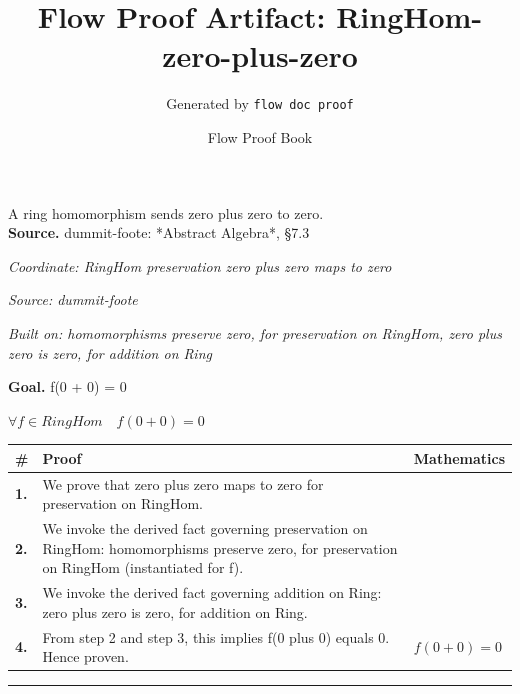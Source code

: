 \documentclass[11pt]{article}
\title{Flow Proof Artifact: RingHom-zero-plus-zero}
\author{Generated by \texttt{flow doc proof}}
\date{Flow Proof Book}
\theoremstyle{definition}
\begin{document}
\maketitle
A ring homomorphism sends zero plus zero to zero.\\[0.5em]
\textbf{Source.} dummit-foote: *Abstract Algebra*, §7.3\\[0.5em]
\bigskip
{}\par
\smallskip\noindent\textit{Coordinate: RingHom \cdot preservation \cdot zero plus zero maps to zero}\par
\smallskip\noindent\textit{Source: dummit-foote}\par
\smallskip\noindent\textit{Built on: homomorphisms preserve zero, for preservation on RingHom, zero plus zero is zero, for addition on Ring}\par
\medskip
\noindent\textbf{Goal.} f(0 + 0) = 0\par
\noindent$\displaystyle \forall f \in RingHom\quad f(0 + 0) = 0$\par
\medskip
\noindent
\begin{tabular}{@{} >{\raggedright\arraybackslash}p{} >{\raggedright\arraybackslash}p{} >{\raggedleft\arraybackslash}p{} @{}}
\textbf{\#} & \textbf{Proof} & \textbf{Mathematics} \\
\midrule
\textbf{1.} & We prove that zero plus zero maps to zero for preservation on RingHom. & \\[0.45em]
\textbf{2.} & We invoke the derived fact governing preservation on RingHom: homomorphisms preserve zero, for preservation on RingHom (instantiated for f). & \\[0.45em]
\textbf{3.} & We invoke the derived fact governing addition on Ring: zero plus zero is zero, for addition on Ring. & \\[0.45em]
\textbf{4.} & From step 2 and step 3, this implies f(0 plus 0) equals 0. Hence proven. & $\displaystyle f(0 + 0) = 0$ \\[0.45em]
\bottomrule
\end{tabular}
\label{thm:RingHom-preservation-zero_plus_zero_maps_to_zero}
\par\medskip\hrule
\end{document}
